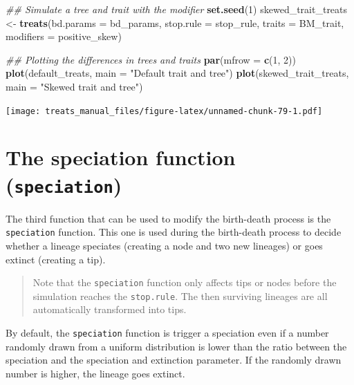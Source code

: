 \documentclass[
]{book}
\newenvironment{Shaded}{\begin{snugshade}}{\end{snugshade}}
\newcommand{\CommentTok}[1]{\textcolor[rgb]{0.56,0.35,0.01}{\textit{#1}}}
\newcommand{\DataTypeTok}[1]{\textcolor[rgb]{0.13,0.29,0.53}{#1}}
\newcommand{\DecValTok}[1]{\textcolor[rgb]{0.00,0.00,0.81}{#1}}
\newcommand{\KeywordTok}[1]{\textcolor[rgb]{0.13,0.29,0.53}{\textbf{#1}}}
\newcommand{\NormalTok}[1]{#1}
\newcommand{\StringTok}[1]{\textcolor[rgb]{0.31,0.60,0.02}{#1}}
\begin{document}
\begin{Shaded}
\begin{Highlighting}[]
\CommentTok{\#\# Simulate a tree and trait with the modifier}
\KeywordTok{set.seed}\NormalTok{(}\DecValTok{1}\NormalTok{)}
\NormalTok{skewed\_trait\_treats \textless{}{-}}\StringTok{ }\KeywordTok{treats}\NormalTok{(}\DataTypeTok{bd.params =}\NormalTok{ bd\_params,}
                          \DataTypeTok{stop.rule =}\NormalTok{ stop\_rule,}
                          \DataTypeTok{traits =}\NormalTok{ BM\_trait,}
                          \DataTypeTok{modifiers =}\NormalTok{ positive\_skew)}

\CommentTok{\#\# Plotting the differences in trees and traits}
\KeywordTok{par}\NormalTok{(}\DataTypeTok{mfrow =} \KeywordTok{c}\NormalTok{(}\DecValTok{1}\NormalTok{, }\DecValTok{2}\NormalTok{))}
\KeywordTok{plot}\NormalTok{(default\_treats, }\DataTypeTok{main =} \StringTok{"Default trait and tree"}\NormalTok{)}
\KeywordTok{plot}\NormalTok{(skewed\_trait\_treats, }\DataTypeTok{main =} \StringTok{"Skewed trait and tree"}\NormalTok{)}
\end{Highlighting}
\end{Shaded}

\texttt{[image: treats\_manual\_files/figure-latex/unnamed-chunk-79-1.pdf]}

\hypertarget{the-speciation-function-speciation}{%
\section{\texorpdfstring{The speciation function (\texttt{speciation})}{The speciation function (speciation)}}\label{the-speciation-function-speciation}}

The third function that can be used to modify the birth-death process is the \texttt{speciation} function.
This one is used during the birth-death process to decide whether a lineage speciates (creating a node and two new lineages) or goes extinct (creating a tip).

\begin{quote}
Note that the \texttt{speciation} function only affects tips or nodes before the simulation reaches the \texttt{stop.rule}.
The then surviving lineages are all automatically transformed into tips.
\end{quote}

By default, the \texttt{speciation} function is trigger a speciation even if a number randomly drawn from a uniform distribution is lower than the ratio between the speciation and the speciation and extinction parameter. If the randomly drawn number is higher, the lineage goes extinct.
\end{document}
